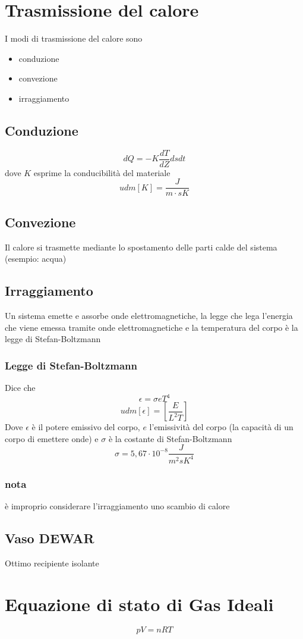 \documentclass[a4paper]{report}
\begin{document}
  \section{Trasmissione del calore}
  I modi di trasmissione del calore sono
  \begin{itemize}
    \item conduzione
    \item convezione
    \item irraggiamento
  \end{itemize}
  \subsection{Conduzione}
  \[ dQ = -K \frac{dT}{dZ} ds dt \]
  dove $K$ esprime la conducibilità del materiale
  \[ udm[K] = \frac{J}{m\cdot sK} \]
  \subsection{Convezione}
  Il calore si trasmette mediante lo spostamento delle parti calde del sistema (esempio: acqua)
  \subsection{Irraggiamento}
  Un sistema emette e assorbe onde elettromagnetiche, la legge che lega l'energia che viene emessa tramite onde elettromagnetiche e la temperatura del corpo è la legge di Stefan-Boltzmann
  \subsubsection{Legge di Stefan-Boltzmann}
  Dice che
  \[\epsilon = \sigma e T^4\]
  \[ udm[\epsilon] = [\frac{E}{L^2T}] \]
  Dove $\epsilon$ è il potere emissivo del corpo, $e$ l'emissività del corpo (la capacità di un corpo di emettere onde) e $\sigma$ è la costante di Stefan-Boltzmann
  \[ \sigma = 5,67 \cdot 10^{-8} \frac{J}{m^2sK^4} \]
  \subsubsection{nota}
  è improprio considerare l'irraggiamento uno scambio di calore
  \subsection{Vaso DEWAR}
  Ottimo recipiente isolante

  \section{Equazione di stato di Gas Ideali}
  \[ pV = nRT \]
\end{document}
